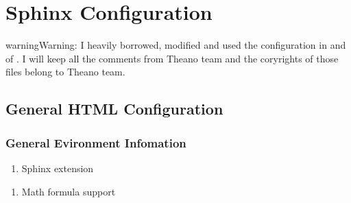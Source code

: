 \documentclass[letterpaper,11pt,english]{sphinxmanual}
\begin{document}
\chapter{Sphinx Configuration}
\label{\detokenize{sphinx:sphinx-configuration}}\label{\detokenize{sphinx:sphinx}}\label{\detokenize{sphinx::doc}}
\begin{sphinxadmonition}{warning}{Warning:}
I heavily borrowed, modified and used the configuration in  and  of . I will keep all the comments from Theano team and the coryrights of those files belong to Theano team.
\end{sphinxadmonition}


\section{General HTML Configuration}
\label{\detokenize{sphinx:general-html-configuration}}

\subsection{General Evironment Infomation}
\label{\detokenize{sphinx:general-evironment-infomation}}\begin{enumerate}
\def\theenumi{\arabic{enumi}}
\def\labelenumi{\theenumi .}
\makeatletter\def\p@enumii{\p@enumi \theenumi .}\makeatother
\item {} 
Sphinx extension

\end{enumerate}

\begin{sphinxVerbatim}[commandchars=\\\{\}]
  \PYG{p}{[}
              \PYG{p}{]}

  
  
  
\end{sphinxVerbatim}
\begin{enumerate}
\def\theenumi{\arabic{enumi}}
\def\labelenumi{\theenumi .}
\makeatletter\def\p@enumii{\p@enumi \theenumi .}\makeatother
\setcounter{enumi}{1}
\item {} 
Math formula support

\end{enumerate}
\end{document}

